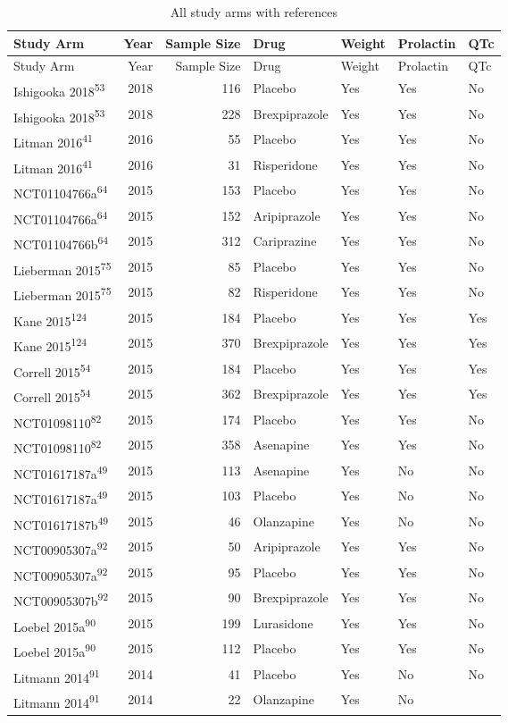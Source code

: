 \documentclass[9pt,english,,jou,floatsintext]{apa6}
\begin{document}
\begin{longtable}[]{@{}lrrllll@{}}
\caption{\label{tab:unnamed-chunk-1}All study arms with
references}\tabularnewline
\toprule
Study Arm & Year & Sample Size & Drug & Weight & Prolactin &
QTc\tabularnewline
\midrule
\endfirsthead
\toprule
Study Arm & Year & Sample Size & Drug & Weight & Prolactin &
QTc\tabularnewline
\midrule
\endhead
Ishigooka 2018\textsuperscript{53} & 2018 & 116 & Placebo & Yes & Yes &
No\tabularnewline
Ishigooka 2018\textsuperscript{53} & 2018 & 228 & Brexpiprazole & Yes &
Yes & No\tabularnewline
Litman 2016\textsuperscript{41} & 2016 & 55 & Placebo & Yes & Yes &
No\tabularnewline
Litman 2016\textsuperscript{41} & 2016 & 31 & Risperidone & Yes & Yes &
No\tabularnewline
NCT01104766a\textsuperscript{64} & 2015 & 153 & Placebo & Yes & Yes &
No\tabularnewline
NCT01104766a\textsuperscript{64} & 2015 & 152 & Aripiprazole & Yes & Yes
& No\tabularnewline
NCT01104766b\textsuperscript{64} & 2015 & 312 & Cariprazine & Yes & Yes
& No\tabularnewline
Lieberman 2015\textsuperscript{75} & 2015 & 85 & Placebo & Yes & Yes &
No\tabularnewline
Lieberman 2015\textsuperscript{75} & 2015 & 82 & Risperidone & Yes & Yes
& No\tabularnewline
Kane 2015\textsuperscript{124} & 2015 & 184 & Placebo & Yes & Yes &
Yes\tabularnewline
Kane 2015\textsuperscript{124} & 2015 & 370 & Brexpiprazole & Yes & Yes
& Yes\tabularnewline
Correll 2015\textsuperscript{54} & 2015 & 184 & Placebo & Yes & Yes &
Yes\tabularnewline
Correll 2015\textsuperscript{54} & 2015 & 362 & Brexpiprazole & Yes &
Yes & Yes\tabularnewline
NCT01098110\textsuperscript{82} & 2015 & 174 & Placebo & Yes & Yes &
No\tabularnewline
NCT01098110\textsuperscript{82} & 2015 & 358 & Asenapine & Yes & Yes &
No\tabularnewline
NCT01617187a\textsuperscript{49} & 2015 & 113 & Asenapine & Yes & No &
No\tabularnewline
NCT01617187a\textsuperscript{49} & 2015 & 103 & Placebo & Yes & No &
No\tabularnewline
NCT01617187b\textsuperscript{49} & 2015 & 46 & Olanzapine & Yes & No &
No\tabularnewline
NCT00905307a\textsuperscript{92} & 2015 & 50 & Aripiprazole & Yes & Yes
& No\tabularnewline
NCT00905307a\textsuperscript{92} & 2015 & 95 & Placebo & Yes & Yes &
No\tabularnewline
NCT00905307b\textsuperscript{92} & 2015 & 90 & Brexpiprazole & Yes & Yes
& No\tabularnewline
Loebel 2015a\textsuperscript{90} & 2015 & 199 & Lurasidone & Yes & Yes &
No\tabularnewline
Loebel 2015a\textsuperscript{90} & 2015 & 112 & Placebo & Yes & Yes &
No\tabularnewline
Litmann 2014\textsuperscript{91} & 2014 & 41 & Placebo & Yes & No &
No\tabularnewline
Litmann 2014\textsuperscript{91} & 2014 & 22 & Olanzapine & Yes & No &

\end{longtable}
\end{document}
